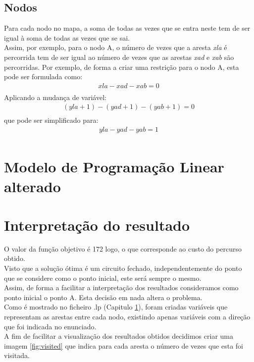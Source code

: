 \documentclass[a4paper]{report}
\begin{document}
\subsection{Nodos}
Para cada nodo no mapa, a soma de todas as vezes que se entra neste
tem de ser igual à soma de todas as vezes que se sai.\\
Assim, por exemplo, para o nodo A, o número de vezes que a aresta
\textit{xla} é percorrida tem de ser igual ao número de vezes que
as arestas \textit{xad} e \textit{xab} são percorridas.
Por exemplo, de forma a criar uma restrição para o nodo A, esta pode ser
formulada como:\\
\begin{multline}
xla- xad - xab = 0 \\
\end{multline}
Aplicando a mudança de variável:
\begin{multline}
(yla + 1) - (yad +1) - (yab +1) = 0 \\
\end{multline}
que pode ser simplificado para:
\begin{multline}
yla - yad - yab = 1\\
\end{multline}

\pagebreak
\section{Modelo de Programação Linear alterado}
\label{input}
















\pagebreak
\section{Interpretação do resultado}
\label{solution}
O valor da função objetivo é 172 logo, o que corresponde ao custo do percurso
obtido.\\
Visto que a solução ótima é um circuito fechado, independentemente do ponto
que se considere como o ponto inicial, este será sempre o mesmo. \\
Assim, de forma a facilitar a interpretação dos resultados consideramos como
ponto inicial o ponto A. Esta decisão em nada altera o problema.\\
Como é mostrado no ficheiro .lp (Capitulo \ref{input}), foram criadas variáveis
que representam as arestas entre cada nodo, existindo apenas variáveis com a
direção que foi indicada no enunciado. \\
A fim de facilitar a visualização dos resultados obtidos decidimos criar uma
imagem \ref{fig:visited} que indica para cada aresta o número de vezes que esta
foi visitada.
\end{document}
